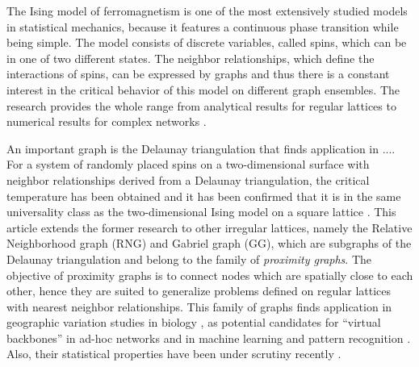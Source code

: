 The Ising model of ferromagnetism \cite{Ising1925} is one of the
most extensively studied models in statistical mechanics, because it
features a continuous phase transition while being simple.
The model consists of discrete variables, called spins, which can be in
one of two different states.
The neighbor relationships, which define the interactions of spins, can be expressed by graphs and
thus there is a constant interest in the critical behavior of this model
on different graph ensembles. The research provides the whole range
from analytical results for regular lattices \cite{Onsager1944,Wannier1945}
to numerical results for complex networks \cite{Aleksiejuk2002260,Herrero2002SmallWorld,Herrero2004ScaleFree,Herrero2015ScaleFree}.

An important graph is the Delaunay triangulation that finds application in ....
For a system of randomly placed spins on a two-dimensional surface
with neighbor relationships derived from a Delaunay triangulation,
the critical temperature has been obtained
and it has been confirmed that it is in the same universality class as the
two-dimensional Ising model on a square lattice \cite{Janke1994,Lima2000,Lima2008}.
This article extends the former research to other
irregular lattices, namely the Relative Neighborhood graph (RNG) and
Gabriel graph (GG), which are subgraphs of the Delaunay triangulation
and belong to the family of \emph{proximity graphs}.
The objective of proximity graphs is to connect nodes which are
spatially close to each other, hence they are suited
to generalize problems defined on regular lattices with nearest neighbor
relationships.
This family of graphs finds application in geographic variation studies in
biology \cite{Sokal1978,Sokal1980,Selander1975}, as potential candidates for ``virtual backbones'' in ad-hoc
networks \cite{Kuhn2003,Bose2001,Santi2005,Karp2000,jennings2002topology}
and in machine learning and pattern recognition \cite{bhattacharya1981application}.
Also, their statistical properties have been under scrutiny recently \cite{RNGCell,norrenbrock2014percolation}.

